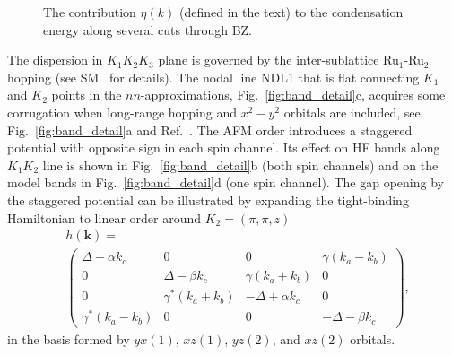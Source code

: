 \documentclass[reprint,twocolumn,superscriptaddress,secnumarabic,amssymb, nobibnotes, aps, prb]{revtex4-1}
\newcommand{\bk}{\mathbf{k}}
\begin{document}
\begin{figure}[t]
\caption{The contribution $\eta(k)$ (defined in the text) to the condensation energy  along several cuts through BZ. 
}
\label{fig:diff}
\end{figure}


The dispersion in $K_1K_2K_3$ plane is governed by the inter-sublattice Ru$_1$-Ru$_2$ hopping
(see SM~\cite{SM} for details). The nodal line NDL1 that is flat connecting $K_1$ and $K_2$ points in the $nn$-approximations, Fig.~\ref{fig:band_detail}c, acquires some corrugation when long-range hopping and $x^2-y^2$ orbitals are included, see Fig.~\ref{fig:band_detail}a and
Ref.~. The AFM order introduces a staggered potential with opposite sign in each spin channel. Its effect on HF bands along $K_1K_2$ line is shown in Fig.~\ref{fig:band_detail}b (both spin channels) and on the model bands in Fig.~\ref{fig:band_detail}d (one spin channel).
The gap opening by the staggered potential can be illustrated by expanding 
the tight-binding Hamiltonian to linear order around $K_2=(\pi,\pi,z)$
\begin{equation}
\label{eq:hlin}
\begin{split}
&h(\bk)=\\
&\begin{pmatrix} 
\Delta +\alpha k_c & 0 & 0 & \gamma(k_a-k_b) \\
0 & \Delta -\beta k_c & \gamma (k_a+k_b) & 0 \\
0 & \gamma^*(k_a+k_b) & -\Delta + \alpha k_c& 0 \\
\gamma^* (k_a-k_b) & 0 & 0 & -\Delta-\beta k_c
\end{pmatrix},
\end{split}
\end{equation}
in the basis formed by $yx(1)$, $xz(1)$, $yz(2)$, and $xz(2)$ orbitals. 
\end{document}
